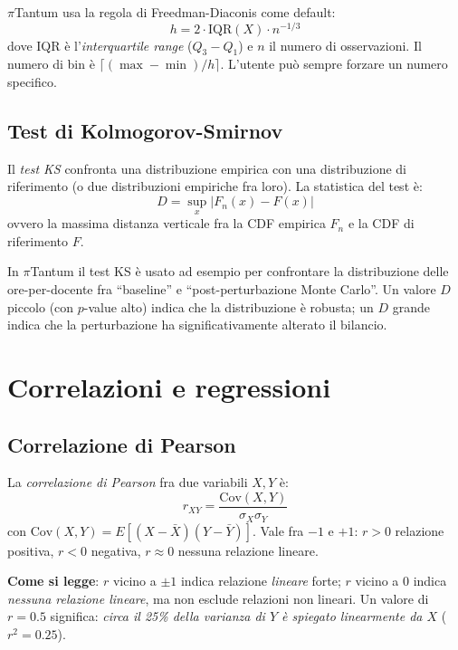 $\pi$Tantum usa la regola di Freedman-Diaconis come default:
\[
  h = 2 \cdot \mathrm{IQR}(X) \cdot n^{-1/3}
\]
dove IQR \`e l'\emph{interquartile range} ($Q_3 - Q_1$) e
$n$ il numero di osservazioni. Il numero di bin \`e
$\lceil (\max - \min) / h \rceil$. L'utente pu\`o sempre
forzare un numero specifico.

\subsection{Test di Kolmogorov-Smirnov}

\begin{defbox}
Il \emph{test KS} confronta
una distribuzione empirica con una distribuzione di
riferimento (o due distribuzioni empiriche fra loro). La
statistica del test \`e:
\[
  D = \sup_x |F_n(x) - F(x)|
\]
ovvero la massima distanza verticale fra la CDF empirica
$F_n$ e la CDF di riferimento $F$.
\end{defbox}

In $\pi$Tantum il test KS \`e usato ad esempio per
confrontare la distribuzione delle ore-per-docente fra
``baseline'' e ``post-perturbazione Monte Carlo''. Un valore
$D$ piccolo (con $p$-value alto) indica che la distribuzione
\`e robusta; un $D$ grande indica che la perturbazione ha
significativamente alterato il bilancio.

\section{Correlazioni e regressioni}

\subsection{Correlazione di Pearson}

\begin{defbox}
La \emph{correlazione di Pearson}
fra due variabili $X, Y$ \`e:
\[
  r_{XY} = \frac{\mathrm{Cov}(X, Y)}{\sigma_X \sigma_Y}
\]
con $\mathrm{Cov}(X, Y) = E[(X - \bar X)(Y - \bar Y)]$. Vale
fra $-1$ e $+1$: $r > 0$ relazione positiva, $r < 0$
negativa, $r \approx 0$ nessuna relazione lineare.
\end{defbox}

\textbf{Come si legge}: $r$ vicino a $\pm 1$ indica
relazione \emph{lineare} forte; $r$ vicino a $0$ indica
\emph{nessuna relazione lineare}, ma non esclude relazioni
non lineari. Un valore di $r = 0.5$ significa: \emph{circa il
25\% della varianza di $Y$ \`e spiegato linearmente da $X$}
($r^2 = 0.25$).

